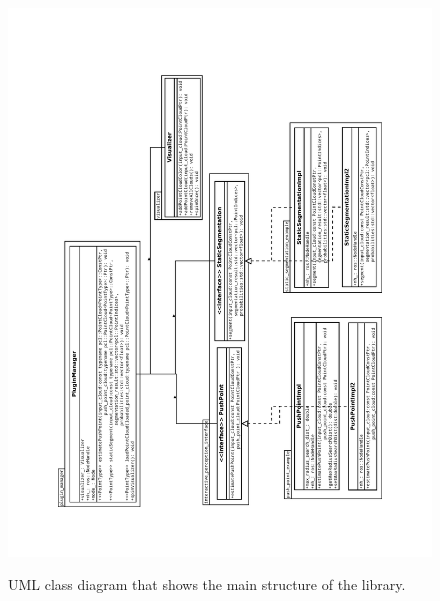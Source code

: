 \begin{figure}
{\includegraphics[width=1.1\columnwidth, angle=-90]{figures/uml2.pdf}}

\caption{UML class diagram that shows the main structure of the library.}
\label{fig:uml}
\end{figure}





